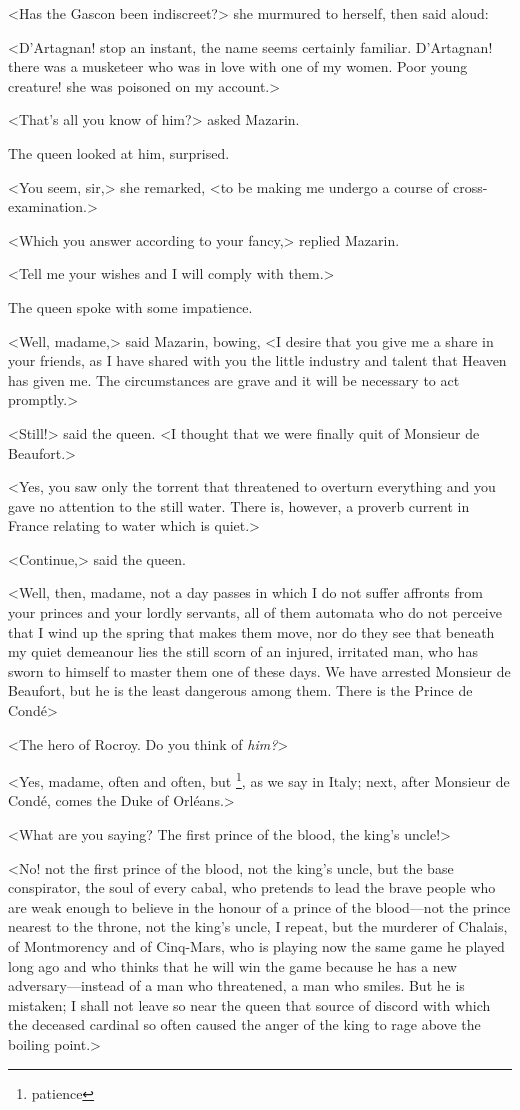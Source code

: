 <Has the Gascon been indiscreet?> she murmured to herself, then said aloud:

<D'Artagnan! stop an instant, the name seems certainly familiar. D'Artagnan! there was a musketeer who was in love with one of my women. Poor young creature! she was poisoned on my account.>

<That's all you know of him?> asked Mazarin.

The queen looked at him, surprised.

<You seem, sir,> she remarked, <to be making me undergo a course of cross-examination.>

<Which you answer according to your fancy,> replied Mazarin.

<Tell me your wishes and I will comply with them.>

The queen spoke with some impatience.

<Well, madame,> said Mazarin, bowing, <I desire that you give me a share in your friends, as I have shared with you the little industry and talent that Heaven has given me. The circumstances are grave and it will be necessary to act promptly.>

<Still!> said the queen. <I thought that we were finally quit of Monsieur de Beaufort.>

<Yes, you saw only the torrent that threatened to overturn everything and you gave no attention to the still water. There is, however, a proverb current in France relating to water which is quiet.>

<Continue,> said the queen.

<Well, then, madame, not a day passes in which I do not suffer affronts from your princes and your lordly servants, all of them automata who do not perceive that I wind up the spring that makes them move, nor do they see that beneath my quiet demeanour lies the still scorn of an injured, irritated man, who has sworn to himself to master them one of these days. We have arrested Monsieur de Beaufort, but he is the least dangerous among them. There is the Prince de Condé\longdash>

<The hero of Rocroy. Do you think of \emph{him?}>

<Yes, madame, often and often, but \footnote{patience}, as we say in Italy; next, after Monsieur de Condé, comes the Duke of Orléans.>

<What are you saying? The first prince of the blood, the king's uncle!>

<No! not the first prince of the blood, not the king's uncle, but the base conspirator, the soul of every cabal, who pretends to lead the brave people who are weak enough to believe in the honour of a prince of the blood—not the prince nearest to the throne, not the king's uncle, I repeat, but the murderer of Chalais, of Montmorency and of Cinq-Mars, who is playing now the same game he played long ago and who thinks that he will win the game because he has a new adversary—instead of a man who threatened, a man who smiles. But he is mistaken; I shall not leave so near the queen that source of discord with which the deceased cardinal so often caused the anger of the king to rage above the boiling point.>

